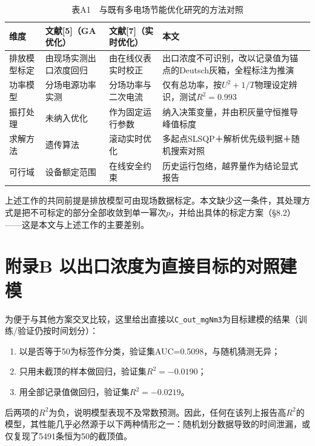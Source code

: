 \documentclass[UTF8,zihao=5,a4paper]{ctexart}
\begin{document}
\begin{table}[htbp]
\centering
\caption*{\normalsize 表A1　与既有多电场节能优化研究的方法对照}
\vspace{-2pt}
\begin{tabularx}{\textwidth}{l>{\hsize=0.828\hsize\raggedright\arraybackslash}X>{\hsize=0.770\hsize\raggedright\arraybackslash}X>{\hsize=1.402\hsize\raggedright\arraybackslash}X}
\toprule
维度 & 文献[5]（GA优化） & 文献[7]（实时优化） & 本文 \\
\midrule
排放模型标定 & 由现场实测出口浓度回归 & 由在线仪表实时校正 & 出口浓度不可识别，改以记录值为锚点的Deutsch灰箱，全程标注为推演 \\
功率模型 & 分场电源功率实测 & 分场功率与二次电流 & 仅有总功率，按$U^2+1/T$物理设定辨识，测试$R^2=0.993$ \\
振打处理 & 未纳入优化 & 作为固定运行参数 & 纳入决策变量，并由积灰量守恒推导峰值标度 \\
求解方法 & 遗传算法 & 滚动实时优化 & 多起点SLSQP＋解析优先级判据＋随机搜索对照 \\
可行域 & 设备额定范围 & 在线安全约束 & 历史运行包络，越界量作为结论显式报告 \\
\bottomrule
\end{tabularx}
\end{table}

上述工作的共同前提是排放模型可由现场数据标定。本文缺少这一条件，其处理方式是把不可标定的部分全部收敛到单一幂次$p$，并给出具体的标定方案（§8.2）——这是本文与上述工作的主要差别。

\section*{附录B 以出口浓度为直接目标的对照建模}

为便于与其他方案交叉比较，这里给出直接以\texttt{C\_out\_mgNm3}为目标建模的结果（训练/验证仍按时间划分）：

\begin{enumerate}[itemsep=1pt,topsep=3pt]
\item 以是否等于50为标签作分类，验证集AUC=0.5098，与随机猜测无异；
\item 只用未截顶的样本做回归，验证集$R^2=-0.0190$；
\item 用全部记录值做回归，验证集$R^2=-0.0219$。
\end{enumerate}

后两项的$R^2$为负，说明模型表现不及常数预测。因此，任何在该列上报告高$R^2$的模型，其性能几乎必然源于以下两种情形之一：随机划分数据导致的时间泄漏，或仅复现了5491条恒为50的截顶值。
\end{document}
